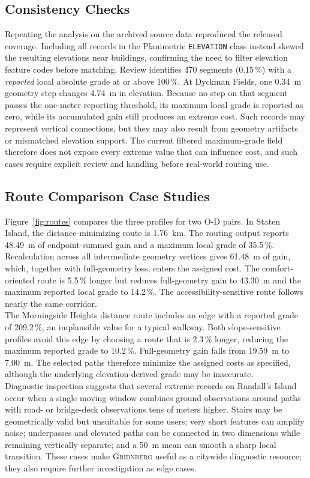 \documentclass[twocolumn,10pt]{article}
\newcommand{\dataset}{\textsc{Gridnberg}\xspace}
\newcommand{\pct}{\,\%\xspace}
\begin{document}
\subsection{Consistency Checks}

Repeating the analysis on the archived source data reproduced the released coverage. Including all records in the Planimetric \texttt{ELEVATION} class instead skewed the resulting elevations near buildings, confirming the need to filter elevation feature codes before matching. Review identifies \num{470} segments (0.15\pct) with a \emph{reported} local absolute grade at or above 100\pct. At Dyckman Fields, one \SI{0.34}{\meter} geometry step changes \SI{4.74}{\meter} in elevation. Because no step on that segment passes the one-meter reporting threshold, its maximum local grade is reported as zero, while its accumulated gain still produces an extreme cost. Such records may represent vertical connections, but they may also result from geometry artifacts or mismatched elevation support. The current filtered maximum-grade field therefore does not expose every extreme value that can influence cost, and such cases require explicit review and handling before real-world routing use.

\subsection{Route Comparison Case Studies}

Figure~\ref{fig:routes} compares the three profiles for two O-D pairs. In Staten Island, the distance-minimizing route is \SI{1.76}{\kilo\meter}. The routing output reports \SI{48.49}{\meter} of endpoint-summed gain and a maximum local grade of 35.5\pct. Recalculation across all intermediate geometry vertices gives \SI{61.48}{\meter} of gain, which, together with full-geometry loss, enters the assigned cost. The comfort-oriented route is 5.5\pct longer but reduces full-geometry gain to \SI{43.30}{\meter} and the maximum reported local grade to 14.2\pct. The accessibility-sensitive route follows nearly the same corridor.
\\
The Morningside Heights distance route includes an edge with a reported grade of 209.2\pct, an implausible value for a typical walkway. Both slope-sensitive profiles avoid this edge by choosing a route that is 2.3\pct longer, reducing the maximum reported grade to 10.2\pct. Full-geometry gain falls from \SI{19.59}{\meter} to \SI{7.00}{\meter}. The selected paths therefore minimize the assigned costs as specified, although the underlying elevation-derived grade may be inaccurate.
\\
Diagnostic inspection suggests that several extreme records on Randall's Island occur when a single moving window combines ground observations around paths with road- or bridge-deck observations tens of meters higher. Stairs may be geometrically valid but unsuitable for some users; very short features can amplify noise; underpasses and elevated paths can be connected in two dimensions while remaining vertically separate; and a \SI{50}{\meter} mean can smooth a sharp local transition. These cases make \dataset useful as a citywide diagnostic resource; they also require further investigation as edge cases.
\end{document}
